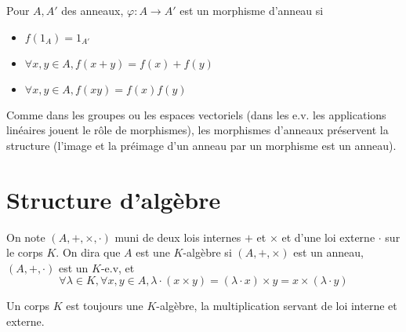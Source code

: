 \begin{dfn}
    Pour $A, A'$ des anneaux, $\varphi:A\to A'$ est un morphisme d'anneau si \begin{itemize}
        \item $f(1_A)=1_{A'}$
        \item $\forall x, y\in A, f(x+y)=f(x)+f(y)$
        \item $\forall x, y\in A, f(xy)=f(x)f(y)$
    \end{itemize}
\end{dfn}

Comme dans les groupes ou les espaces vectoriels (dans les e.v. les applications linéaires jouent le rôle de morphismes), les morphismes d'anneaux préservent la structure (l'image et la préimage d'un anneau par un morphisme est un anneau).

\section{Structure d'algèbre}

\begin{dfn}
    On note $(A, +, \times, \cdot)$ muni de deux lois internes $+$ et $\times$ et d'une loi externe $\cdot$ sur le corps $K$. On dira que $A$ est une $K$-algèbre si $(A, +,\times)$ est un anneau, $(A, +, \cdot)$ est un $K$-e.v, et \[
        \forall \lambda\in K, \forall x, y\in A, \lambda\cdot (x\times y)=(\lambda\cdot x)\times y=x\times (\lambda\cdot y)
    \]
\end{dfn}

\begin{rem}
    Un corps $K$ est toujours une $K$-algèbre, la multiplication servant de loi interne et externe.
\end{rem}
\endchapter
